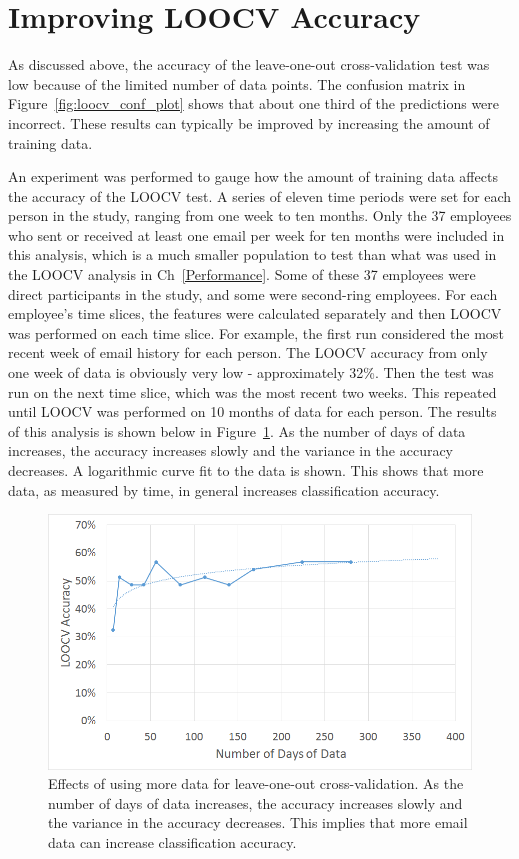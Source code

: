 \documentclass[12pt]{report}
\begin{document}
\section{Improving LOOCV Accuracy}
As discussed above, the accuracy of the leave-one-out cross-validation test was low because of the limited number of data points.
The confusion matrix in Figure~\ref{fig:loocv_conf_plot} shows that about one third of the predictions were incorrect.  
These results can typically be improved by increasing the amount of training data. 

An experiment was performed to gauge how the amount of training data affects the accuracy of the LOOCV test.
A series of eleven time periods were set for each person in the study, ranging from one week to ten months.
Only the 37 employees who sent or received at least one email per week for ten months were included in this analysis, which is a much smaller population to test than what was used in the LOOCV analysis in Ch~\ref{Performance}.
Some of these 37 employees were direct participants in the study, and some were second-ring employees.
For each employee's time slices, the features were calculated separately and then LOOCV was performed on each time slice.
For example, the first run considered the most recent week of email history for each person.
The LOOCV accuracy from only one week of data is obviously very low - approximately 32\%.
Then the test was run on the next time slice, which was the most recent two weeks.
This repeated until LOOCV was performed on 10 months of data for each person.
The results of this analysis is shown below in Figure~\ref{fig:loocv_generalization}.
As the number of days of data increases, the accuracy increases slowly and the variance in the accuracy decreases.
A logarithmic curve fit to the data is shown.
This shows that more data, as measured by time, in general increases classification accuracy.
\begin{figure}[t]
    \centering
        \includegraphics[width=.7\columnwidth,trim={1mm 2mm 1mm 3.5mm},clip]{generalization}
        \vspace{-7pt}
        \caption[Effects of more data on prediction accuracy]{Effects of using more data for leave-one-out cross-validation.  As the number of days of data increases, the accuracy increases slowly and the variance in the accuracy decreases.  This implies that more email data can increase classification accuracy.}
        \label{fig:loocv_generalization}
\end{figure}
\end{document}
